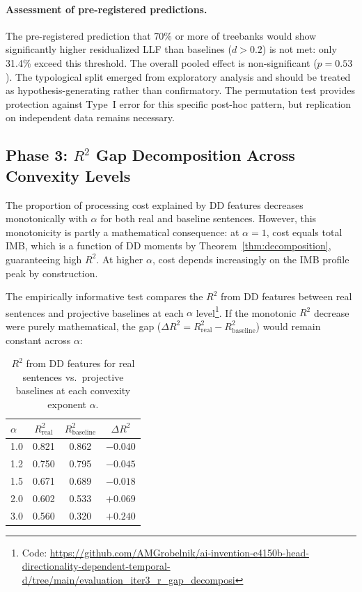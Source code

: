 \documentclass[11pt,letterpaper]{article}
\begin{document}
\paragraph{Assessment of pre-registered predictions.} The pre-registered prediction that 70\% or more of treebanks would show significantly higher residualized LLF than baselines ($d > 0.2$) is not met: only 31.4\% exceed this threshold. The overall pooled effect is non-significant ($p = 0.53$). The typological split emerged from exploratory analysis and should be treated as hypothesis-generating rather than confirmatory. The permutation test provides protection against Type~I error for this specific post-hoc pattern, but replication on independent data remains necessary.


\subsection{Phase 3: $R^2$ Gap Decomposition Across Convexity Levels}
\label{sec:r2gap}

The proportion of processing cost explained by DD features decreases monotonically with $\alpha$ for both real and baseline sentences. However, this monotonicity is partly a mathematical consequence: at $\alpha = 1$, cost equals total IMB, which is a function of DD moments by Theorem~\ref{thm:decomposition}, guaranteeing high $R^2$. At higher $\alpha$, cost depends increasingly on the IMB profile peak by construction.

The empirically informative test compares the $R^2$ from DD features between real sentences and projective baselines at each $\alpha$ level\footnote{Code: \url{https://github.com/AMGrobelnik/ai-invention-e4150b-head-directionality-dependent-temporal-d/tree/main/evaluation_iter3_r_gap_decomposi}}. If the monotonic $R^2$ decrease were purely mathematical, the gap ($\Delta R^2 = R^2_{\text{real}} - R^2_{\text{baseline}}$) would remain constant across $\alpha$:

\begin{table}[!htbp]
\centering
\caption{$R^2$ from DD features for real sentences vs.\ projective baselines at each convexity exponent $\alpha$.}
\label{tab:r2gap}
\begin{tabular}{@{}lccc@{}}
\toprule
$\alpha$ & $R^2_{\text{real}}$ & $R^2_{\text{baseline}}$ & $\Delta R^2$ \\
\midrule
1.0 & 0.821 & 0.862 & $-0.040$ \\
1.2 & 0.750 & 0.795 & $-0.045$ \\
1.5 & 0.671 & 0.689 & $-0.018$ \\
2.0 & 0.602 & 0.533 & $+0.069$ \\
3.0 & 0.560 & 0.320 & $+0.240$ \\
\bottomrule
\end{tabular}
\end{table}
\end{document}
